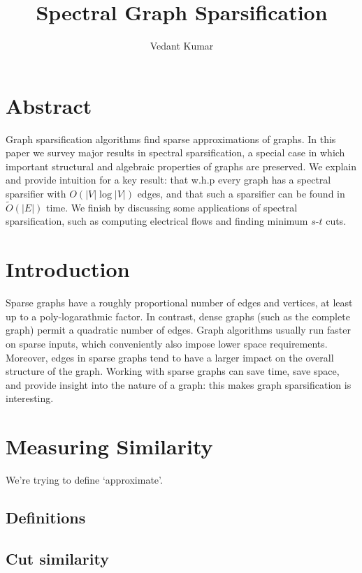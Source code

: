 \documentclass{article}
\title{Spectral Graph Sparsification}
\author{Vedant Kumar}
\begin{document}
\maketitle

\newcommand \textlcsc[1]{\textsc{\MakeLowercase{#1}}}

\section*{Abstract}

Graph sparsification algorithms find sparse approximations of graphs. In
this paper we survey major results in spectral sparsification, a special
case in which important structural and algebraic properties of graphs are
preserved. We explain and provide intuition for a key result: that w.h.p
every graph has a spectral sparsifier with $O(|V|\log|V|)$ edges, and that
such a sparsifier can be found in $\tilde{O}(|E|)$ time. We finish by
discussing some applications of spectral sparsification, such as computing
electrical flows and finding minimum $s$-$t$ cuts.

\section{Introduction}

Sparse graphs have a roughly proportional number of edges and vertices, at
least up to a poly-logarathmic factor. In contrast, dense graphs (such as
the complete graph) permit a quadratic number of edges. Graph algorithms
usually run faster on sparse inputs, which conveniently also impose lower
space requirements. Moreover, edges in sparse graphs tend to have a larger
impact on the overall structure of the graph. Working with sparse graphs can
save time, save space, and provide insight into the nature of a graph: this
makes graph sparsification is interesting.

\section{Measuring Similarity}

We're trying to define `approximate'.

\subsection{Definitions}

\subsection{Cut similarity}
\end{document}
